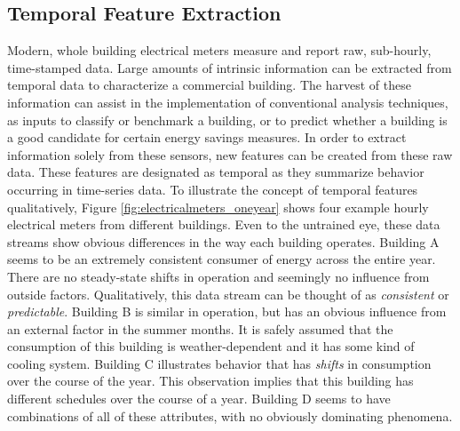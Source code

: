 \subsection{Temporal Feature Extraction}
\label{temporalfeatureextraction}
Modern, whole building electrical meters measure and report raw, sub-hourly, time-stamped data. Large amounts of intrinsic information can be extracted from temporal data to characterize a commercial building. The harvest of these information can assist in the implementation of conventional analysis techniques, as inputs to classify or benchmark a building, or to predict whether a building is a good candidate for certain energy savings measures. In order to extract information solely from these sensors, new features can be created from these raw data. These features are designated as temporal as they summarize behavior occurring in time-series data. To illustrate the concept of temporal features qualitatively, Figure \ref{fig:electricalmeters_oneyear} shows four example hourly electrical meters from different buildings. Even to the untrained eye, these data streams show obvious differences in the way each building operates. Building A seems to be an extremely consistent consumer of energy across the entire year. There are no steady-state shifts in operation and seemingly no influence from outside factors. Qualitatively, this data stream can be thought of as \emph{consistent} or \emph{predictable}. Building B is similar in operation, but has an obvious influence from an external factor in the summer months. It is safely assumed that the consumption of this building is weather-dependent and it has some kind of cooling system. Building C illustrates behavior that has \emph{shifts} in consumption over the course of the year. This observation implies that this building has different schedules over the course of a year. Building D seems to have combinations of all of these attributes, with no obviously dominating phenomena. 
